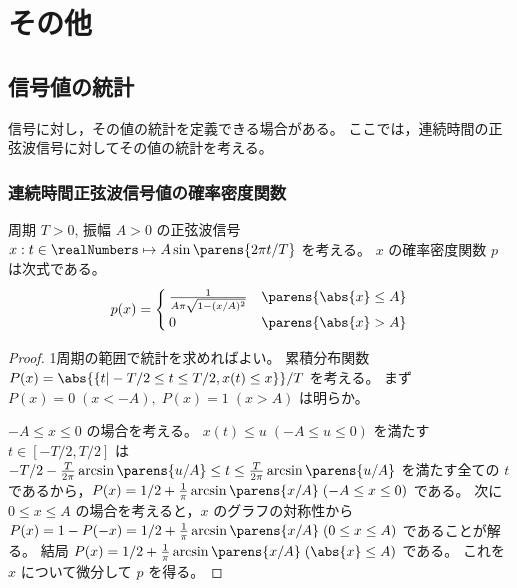 \part{その他}
    \chapter{信号値の統計}
        信号に対し，その値の統計を定義できる場合がある。
        ここでは，連続時間の正弦波信号に対してその値の統計を考える。
        \section{連続時間正弦波信号値の確率密度関数}
            \begin{shadebox}
                周期 $T>0$, 振幅 $A>0$ の正弦波信号 $x:t\in\realNumbers\mapsto A\sin\parens{2\pi t/T}$ を考える。
                $x$ の確率密度関数 $p$ は次式である。
                \[
                    p(x) = \begin{cases}
                        \frac{1}{A\pi\sqrt{1-(x/A)^2}} & \parens{\abs{x} \leq A} \\
                        0 & \parens{\abs{x} > A} \\
                    \end{cases}
                \]
            \end{shadebox}
            \begin{proof}
                \quad\par
                1周期の範囲で統計を求めればよい。
                累積分布関数 $P(x) = \abs{\{t|-T/2\leq t\leq T/2, x(t) \leq x\}}/T$ を考える。
                まず $P(x) = 0\;(x < -A),\;P(x) = 1\;(x > A)$ は明らか。
                \par
                $-A \leq x \leq 0$ の場合を考える。
                $x(t) \leq u\;(-A \leq u \leq 0)$ を満たす $t\in[-T/2,T/2]$ は $-T/2 - \frac{T}{2\pi}\arcsin\parens{u/A}\leq t \leq \frac{T}{2\pi}\arcsin\parens{u/A}$ を満たす全ての $t$ であるから，$P(x) = 1/2 + \frac{1}{\pi}\arcsin\parens{x/A}\;(-A\leq x\leq 0)$ である。
                次に$0 \leq x \leq A$ の場合を考えると，$x$ のグラフの対称性から $P(x) = 1 - P(-x) = 1/2 + \frac{1}{\pi}\arcsin\parens{x/A}\;(0 \leq x \leq A)$ であることが解る。
                結局 $P(x) = 1/2 + \frac{1}{\pi}\arcsin\parens{x/A}\;(\abs{x}\leq A)$ である。
                これを $x$ について微分して $p$ を得る。
            \end{proof}
